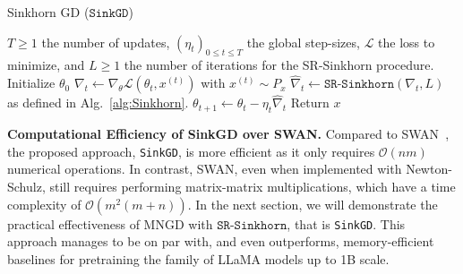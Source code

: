 \begin{algorithm}
   \caption{Sinkhorn GD ($\texttt{SinkGD}$)}
   \label{alg:multi-normalized-sinkhorn}
\begin{algorithmic}
    $T\geq 1$ the number of updates, $(\eta_t)_{0\leq t\leq T}$ the global step-sizes, $\mathcal{L}$ the loss to minimize, and $L\geq 1$ the number of iterations for the SR-Sinkhorn procedure.
   \STATE Initialize $\theta_0$
    \STATE $\nabla_t\gets \nabla_{\theta}\mathcal{L}(\theta_t, x^{(t)})$ with $x^{(t)}\sim P_x$
    \STATE $\hat{\nabla}_t \gets \texttt{SR-Sinkhorn}(\nabla_t,L)$ as defined in Alg.~\ref{alg:Sinkhorn}.
    \STATE $\theta_{t+1} \gets \theta_t - \eta_t \hat{\nabla}_t$
    \ENDFOR
    \STATE Return $x$
\end{algorithmic}
\end{algorithm}
\vspace{-0.2cm}

\textbf{Computational Efficiency of SinkGD over SWAN.} Compared to SWAN~\cite{ma2024swansgdnormalizationwhitening}, the proposed approach,  \texttt{SinkGD}, is more efficient as it only requires $\mathcal{O}(nm)$ numerical operations. In contrast, SWAN, even when implemented with Newton-Schulz, still requires performing matrix-matrix multiplications, which have a time complexity of $\mathcal{O}(m^2(m+n))$. In the next section, we will demonstrate the practical effectiveness of MNGD with $\texttt{SR-Sinkhorn}$, that is \texttt{SinkGD}. This approach manages to be on par with, and even outperforms,  memory-efficient baselines for pretraining the family of LLaMA models up to 1B scale.









